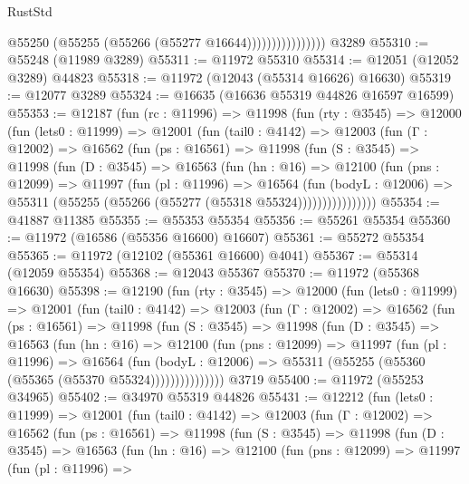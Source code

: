 \begin{lexlean}{RustStd}
\begin{coremodule}
                            @55250 (@55255 (@55266 (@55277 @16644))))))))))))))))
    @3289
@55310 := @55248 (@11989 @3289)
@55311 := @11972 @55310
@55314 := @12051 (@12052 @3289) @44823
@55318 := @11972 (@12043 (@55314 @16626) @16630)
@55319 := @12077 @3289
@55324 := @16635 (@16636 @55319 @44826 @16597 @16599)
@55353 := @12187
    (fun (rc : @11996) =>
    @11998
      (fun (rty : @3545) =>
      @12000
        (fun (lets0 : @11999) =>
        @12001
          (fun (tail0 : @4142) =>
          @12003
            (fun (Γ : @12002) =>
            @16562
              (fun (ps : @16561) =>
              @11998
                (fun (S : @3545) =>
                @11998
                  (fun (D : @3545) =>
                  @16563
                    (fun (hn : @16) =>
                    @12100
                      (fun (pns : @12099) =>
                      @11997
                        (fun (pl : @11996) =>
                        @16564
                          (fun (bodyL : @12006) =>
                          @55311 (@55255 (@55266 (@55277 (@55318 @55324))))))))))))))))
@55354 := @41887 @11385
@55355 := @55353 @55354
@55356 := @55261 @55354
@55360 := @11972 (@16586 (@55356 @16600) @16607)
@55361 := @55272 @55354
@55365 := @11972 (@12102 (@55361 @16600) @4041)
@55367 := @55314 (@12059 @55354)
@55368 := @12043 @55367
@55370 := @11972 (@55368 @16630)
@55398 := @12190
    (fun (rty : @3545) =>
    @12000
      (fun (lets0 : @11999) =>
      @12001
        (fun (tail0 : @4142) =>
        @12003
          (fun (Γ : @12002) =>
          @16562
            (fun (ps : @16561) =>
            @11998
              (fun (S : @3545) =>
              @11998
                (fun (D : @3545) =>
                @16563
                  (fun (hn : @16) =>
                  @12100
                    (fun (pns : @12099) =>
                    @11997
                      (fun (pl : @11996) =>
                      @16564
                        (fun (bodyL : @12006) =>
                        @55311 (@55255 (@55360 (@55365 (@55370 @55324)))))))))))))))
    @3719
@55400 := @11972 (@55253 @34965)
@55402 := @34970 @55319 @44826
@55431 := @12212
    (fun (lets0 : @11999) =>
    @12001
      (fun (tail0 : @4142) =>
      @12003
        (fun (Γ : @12002) =>
        @16562
          (fun (ps : @16561) =>
          @11998
            (fun (S : @3545) =>
            @11998
              (fun (D : @3545) =>
              @16563
                (fun (hn : @16) =>
                @12100
                  (fun (pns : @12099) =>
                  @11997
                    (fun (pl : @11996) =>

\end{coremodule}
\end{lexlean}
